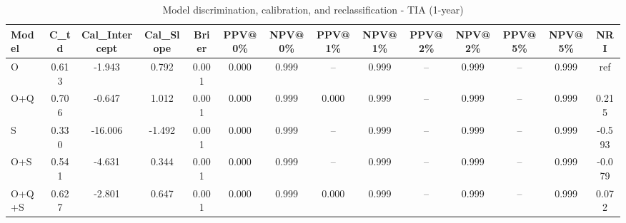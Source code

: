 \begin{table}[htbp]
\centering
\small
\caption{Model discrimination, calibration, and reclassification - TIA (1-year)}
\label{tab:perf_tia_1y}
\begin{tabular}{lccccccccccccc}
\toprule
Model & C\_td & Cal\_Intercept & Cal\_Slope & Brier & PPV@0\% & NPV@0\% & PPV@1\% & NPV@1\% & PPV@2\% & NPV@2\% & PPV@5\% & NPV@5\% & NRI \\
\midrule
O & 0.613 & -1.943 & 0.792 & 0.001 & 0.000 & 0.999 & -- & 0.999 & -- & 0.999 & -- & 0.999 & ref \\
O+Q & 0.706 & -0.647 & 1.012 & 0.001 & 0.000 & 0.999 & 0.000 & 0.999 & -- & 0.999 & -- & 0.999 & 0.215 \\
S & 0.330 & -16.006 & -1.492 & 0.001 & 0.000 & 0.999 & -- & 0.999 & -- & 0.999 & -- & 0.999 & -0.593 \\
O+S & 0.541 & -4.631 & 0.344 & 0.001 & 0.000 & 0.999 & -- & 0.999 & -- & 0.999 & -- & 0.999 & -0.079 \\
O+Q+S & 0.627 & -2.801 & 0.647 & 0.001 & 0.000 & 0.999 & 0.000 & 0.999 & -- & 0.999 & -- & 0.999 & 0.072 \\
\bottomrule
\end{tabular}
\end{table}